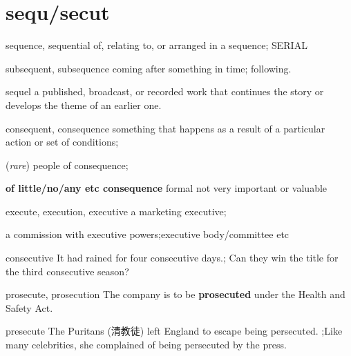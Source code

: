 \chapter{sequ/secut}

\begin{word}{sequence, sequential}
    of, relating to, or arranged in a sequence; SERIAL
\end{word}

\begin{word}{subsequent, subsequence}
    coming after something in time; following.
\end{word}

\begin{word}{sequel}
    a published, broadcast, or recorded work that continues the story or develops the theme of an earlier one.
\end{word}

\begin{word}{consequent, consequence}
    something that happens as a result of a particular action or set of conditions; 
    
    (\textit{rare}) people of consequence; 
    
    \textbf{of little/no/any etc consequence} formal not very important or valuable
\end{word}

\begin{word}{execute, execution, executive}
    a marketing executive; 
    
    a commission with executive powers;executive body/committee etc
\end{word}

\begin{word}{consecutive}
    It had rained for four consecutive days.;
    Can they win the title for the third consecutive season?
\end{word}

\begin{word}{prosecute, prosecution}
    The company is to be \textbf{prosecuted} under the Health and Safety Act.
\end{word}

\begin{word}{presecute}
    The Puritans (清教徒) left England to escape being persecuted. ;Like many celebrities, she complained of being persecuted by the press.
\end{word}